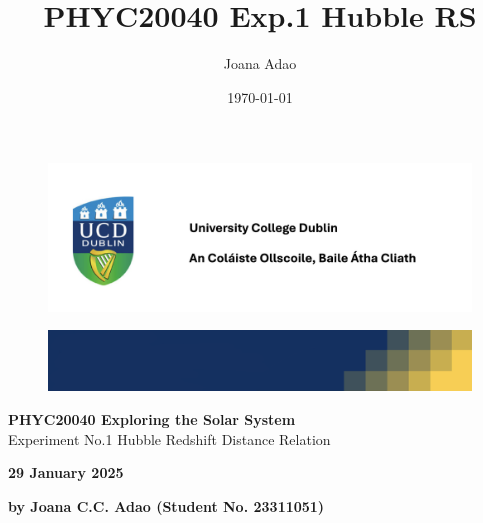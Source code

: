 \documentclass[12pt]{article}
\title{PHYC20040 Exp.1 Hubble RS}
\author{Joana Adao}
\date{\today}
\begin{document}
\begin{titlepage}
    \begin{center}

        \begin{figure}[ht]
            \includegraphics[width=\textwidth]{UCDLogo.png}
        \end{figure}
        
        \begin{figure}
            \centerline{\includegraphics[width=\paperwidth]{UCDBanner.png}}
        \end{figure}

        \vspace{4cm}

        {\LARGE \bfseries PHYC20040 Exploring the Solar System}\\
        \vspace{0.75cm}
        {\Large Experiment No.1 Hubble Redshift Distance Relation}
        
        \vspace{1cm}
    
    {\Large \textbf{29 January 2025 }}

    \vspace{2cm}
    
    {\large \textbf{by Joana C.C. Adao (Student No. 23311051)}}\\

    \end{center}
    
   \clearpage

\end{titlepage}

\setcounter{page}{1}
\tableofcontents

\newpage
\end{document}
